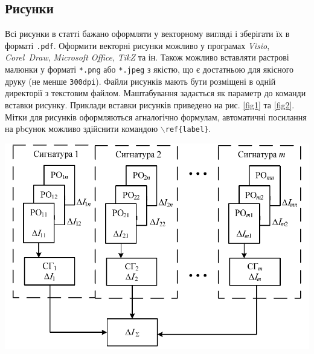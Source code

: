 \begin{multicols}{2} %


\subsection{Рисунки}
Всі рисунки в статті бажано оформляти у векторному вигляді і зберігати їх в форматі \texttt{.pdf}. Оформити векторні рисунки можливо у програмах \textit{Visio}, \textit{Corel~Draw}, \textit{Microsoft Office}, \textit{TikZ} та ін. Також можливо вставляти растрові малюнки у форматі \texttt{*.png} або \texttt{*.jpeg} з якістю, що є достатньою для якісного друку (не менше \texttt{300dpi}). Файли рисунків мають бути розміщені в одній директорії з текстовим файлом. Маштабування задається як параметр до команди вставки рисунку. Приклади вставки рисунків приведено на рис. \ref{fig1} та \ref{fig2}. Мітки для рисунків оформляються агналогічно формулам, автоматичні посилання на рbсунок можливо здійснити командою \texttt{$\backslash$ref\{label\}}.


\begin{Figure}\centering%
	\includegraphics[width=\linewidth]{fig1}
	\label{fig1}
\end{Figure}


\end{multicols}
